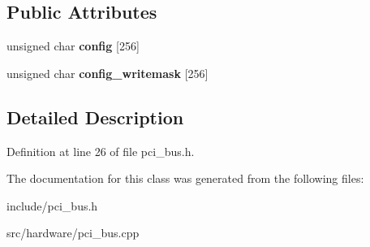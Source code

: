 \subsection*{Public Attributes}
\begin{DoxyCompactItemize}
\item 
\hypertarget{classPCI__Device_a96714f926af98bbc3ae6030b918e4371}{unsigned char {\bfseries config} \mbox{[}256\mbox{]}}\label{classPCI__Device_a96714f926af98bbc3ae6030b918e4371}

\item 
\hypertarget{classPCI__Device_a0dc5ffb8e062148eb946488cfdf9b2fc}{unsigned char {\bfseries config\-\_\-writemask} \mbox{[}256\mbox{]}}\label{classPCI__Device_a0dc5ffb8e062148eb946488cfdf9b2fc}

\end{DoxyCompactItemize}


\subsection{Detailed Description}


Definition at line 26 of file pci\-\_\-bus.\-h.



The documentation for this class was generated from the following files\-:\begin{DoxyCompactItemize}
\item 
include/pci\-\_\-bus.\-h\item 
src/hardware/pci\-\_\-bus.\-cpp\end{DoxyCompactItemize}

